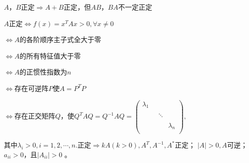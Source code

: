 $A$，$B$正定$\Rightarrow A +B$正定，但${AB}$，${BA}$不一定正定

$A$正定$\Leftrightarrow f(x) = x^{T}{Ax} > 0,\forall x \neq 0$

$\Leftrightarrow A$的各阶顺序主子式全大于零

$\Leftrightarrow A$的所有特征值大于零

$\Leftrightarrow A$的正惯性指数为$n$

$\Leftrightarrow$存在可逆阵$P$使$A = P^{T}P$

$\Leftrightarrow$存在正交矩阵$Q$，使$Q^{T}{AQ} = Q^{- 1}{AQ} =\begin{pmatrix} \lambda_{1} & & \\ \begin{matrix}  & \\  & \\ \end{matrix} &\ddots & \\  & & \lambda_{n} \\ \end{pmatrix},$

其中$\lambda_{i} > 0,i = 1,2,\cdots,n.$正定$\Rightarrow {kA}(k >0),A^{T},A^{- 1},A^{*}$正定； $|A| > 0,A$可逆；$a_{{ii}} >0$，且$|A_{{ii}}| > 0$ 。


